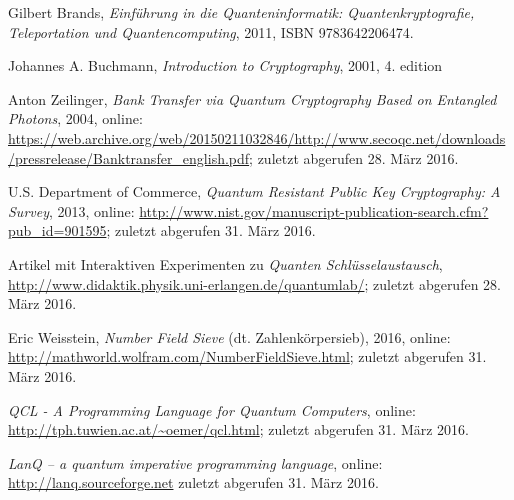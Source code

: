 \documentclass[letterpaper, 12pt]{article}
\begin{document}
\parindent 0pt
\parskip 6pt



\clearpage
\thispagestyle{empty}
\tableofcontents

\newpage
{}
\pagestyle{fancy}



\newpage



\clearpage

\begin{thebibliography}{9}

    Gilbert Brands,
    \emph{Einführung in die Quanteninformatik: Quantenkryptografie, Teleportation und Quantencomputing},
    2011,
    ISBN 9783642206474.
    
    Johannes A. Buchmann,
    \emph{Introduction to Cryptography}, 
    2001, 4. edition
    
    Anton Zeilinger,
    \emph{Bank Transfer via Quantum Cryptography Based on Entangled Photons}, 
    2004, 
    online: \url{https://web.archive.org/web/20150211032846/http://www.secoqc.net/downloads/pressrelease/Banktransfer_english.pdf};
    zuletzt abgerufen 28. März 2016.
        
    U.S. Department of Commerce,
    \emph{Quantum Resistant Public Key Cryptography: A Survey},
    2013,
    online: \url{http://www.nist.gov/manuscript-publication-search.cfm?pub_id=901595};
    zuletzt abgerufen 31. März 2016.
    
    Artikel mit Interaktiven Experimenten zu \emph{Quanten Schlüsselaustausch},
    \url{http://www.didaktik.physik.uni-erlangen.de/quantumlab/};
    zuletzt abgerufen 28. März 2016.
    
    Eric Weisstein,
    \emph{Number Field Sieve} (dt. Zahlenkörpersieb),
    2016,
    online: \url{http://mathworld.wolfram.com/NumberFieldSieve.html};
    zuletzt abgerufen 31. März 2016.
    
    
    \emph{QCL - A Programming Language for Quantum Computers},
    online: \url{http://tph.tuwien.ac.at/~oemer/qcl.html};
    zuletzt abgerufen 31. März 2016.
    
    \emph{LanQ – a quantum imperative programming language},
    online: \url{http://lanq.sourceforge.net}
    zuletzt abgerufen 31. März 2016.
    

\end{thebibliography}
\end{document}
